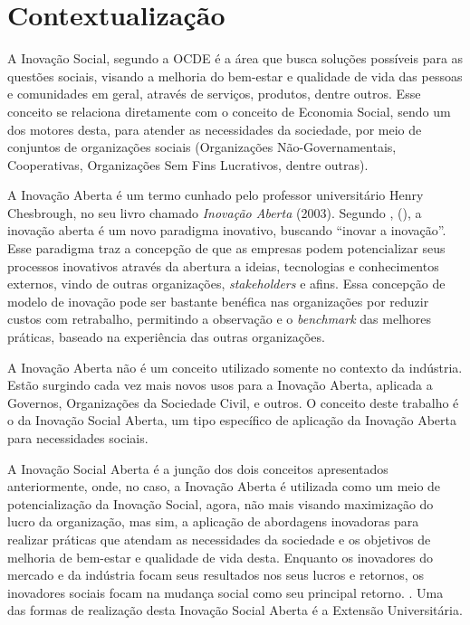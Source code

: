 \section{Contextualização}
\label{contextualizacao}

A Inovação Social, segundo a \gls{OCDE} \cite{ocde2024social} é a área que busca soluções possíveis para as questões sociais, visando a melhoria do bem-estar e qualidade de vida das pessoas e comunidades em geral, através de serviços, produtos, dentre outros. Esse conceito se relaciona diretamente com o conceito de Economia Social, sendo um dos motores desta, para atender as necessidades da sociedade, por meio de conjuntos de organizações sociais (Organizações Não-Governamentais, Cooperativas, Organizações Sem Fins Lucrativos, dentre outras).

A Inovação Aberta é um termo cunhado pelo professor universitário Henry Chesbrough, no seu livro chamado \textit{Inovação Aberta} (2003). Segundo \citeauthor{chesbrough2003}, (\citeyear{chesbrough2003}), a inovação aberta é um novo paradigma inovativo, buscando “inovar a inovação”.
Esse paradigma traz a concepção de que as empresas podem potencializar seus processos inovativos através da abertura a ideias, tecnologias e conhecimentos externos, vindo de outras organizações, \textit{stakeholders} e afins. Essa concepção de modelo de inovação pode ser bastante benéfica nas organizações por reduzir custos com retrabalho, permitindo a observação e o \textit{benchmark} das melhores práticas, baseado na experiência das outras organizações.

A Inovação Aberta não é um conceito utilizado somente no contexto da indústria. Estão surgindo cada vez mais novos usos para a Inovação Aberta, aplicada a Governos, Organizações da Sociedade Civil, e outros. O conceito deste trabalho é o da Inovação Social Aberta, um tipo específico de aplicação da Inovação Aberta para necessidades sociais.

A Inovação Social Aberta é a junção dos dois conceitos apresentados anteriormente, onde, no caso, a Inovação Aberta é utilizada como um meio de potencialização da Inovação Social, agora, não mais visando maximização do lucro da organização, mas sim, a aplicação de abordagens inovadoras para realizar práticas que atendam as necessidades da sociedade e os objetivos de melhoria de bem-estar e qualidade de vida desta. Enquanto os inovadores do mercado e da indústria focam seus resultados nos seus lucros e retornos, os inovadores sociais focam na mudança social como seu principal retorno. \cite{chesbrough2014}. Uma das formas de realização desta Inovação Social Aberta é a Extensão Universitária.

